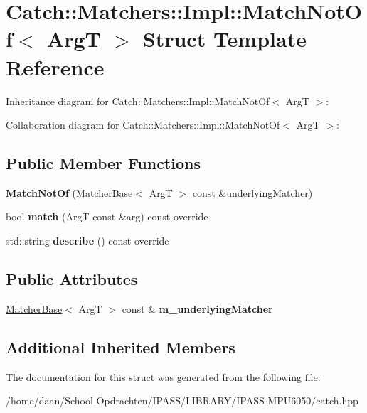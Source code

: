 \hypertarget{structCatch_1_1Matchers_1_1Impl_1_1MatchNotOf}{}\section{Catch\+:\+:Matchers\+:\+:Impl\+:\+:Match\+Not\+Of$<$ ArgT $>$ Struct Template Reference}
\label{structCatch_1_1Matchers_1_1Impl_1_1MatchNotOf}


Inheritance diagram for Catch\+:\+:Matchers\+:\+:Impl\+:\+:Match\+Not\+Of$<$ ArgT $>$\+:


Collaboration diagram for Catch\+:\+:Matchers\+:\+:Impl\+:\+:Match\+Not\+Of$<$ ArgT $>$\+:
\subsection*{Public Member Functions}
\begin{DoxyCompactItemize}
\item 
\mbox{\label{structCatch_1_1Matchers_1_1Impl_1_1MatchNotOf_a47afdd9e4c3354cef85adc3186097ae4}} 
{\bfseries Match\+Not\+Of} (\hyperlink{structCatch_1_1Matchers_1_1Impl_1_1MatcherBase}{Matcher\+Base}$<$ ArgT $>$ const \&underlying\+Matcher)
\item 
\mbox{\label{structCatch_1_1Matchers_1_1Impl_1_1MatchNotOf_a181d693c0258e582d80dc6117a1f2b66}} 
bool {\bfseries match} (ArgT const \&arg) const override
\item 
\mbox{\label{structCatch_1_1Matchers_1_1Impl_1_1MatchNotOf_ac5fb4ef6a9069d23a4098c3c818f06b0}} 
std\+::string {\bfseries describe} () const override
\end{DoxyCompactItemize}
\subsection*{Public Attributes}
\begin{DoxyCompactItemize}
\item 
\mbox{\label{structCatch_1_1Matchers_1_1Impl_1_1MatchNotOf_af7ac67f112b0e93796b048a47329aad4}} 
\hyperlink{structCatch_1_1Matchers_1_1Impl_1_1MatcherBase}{Matcher\+Base}$<$ ArgT $>$ const  \& {\bfseries m\+\_\+underlying\+Matcher}
\end{DoxyCompactItemize}
\subsection*{Additional Inherited Members}


The documentation for this struct was generated from the following file\+:\begin{DoxyCompactItemize}
\item 
/home/daan/\+School Opdrachten/\+I\+P\+A\+S\+S/\+L\+I\+B\+R\+A\+R\+Y/\+I\+P\+A\+S\+S-\/\+M\+P\+U6050/catch.\+hpp\end{DoxyCompactItemize}
